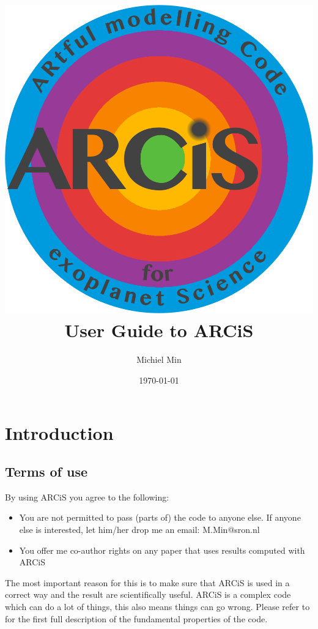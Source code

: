 \documentclass[12pt]{article}
\begin{document}
\title{\includegraphics[width=0.9\hsize]{ARCiS}\\User Guide to ARCiS}
\author{Michiel Min}
\date{\today}
\maketitle

\section{Introduction}


\subsection{Terms of use}

By using ARCiS you agree to the following:
\begin{itemize}
\item You are not permitted to pass (parts of) the code to anyone else. If anyone else is interested, let him/her drop me an email: M.Min@sron.nl
\item You offer me co-author rights on any paper that uses results computed with ARCiS
\end{itemize}
The most important reason for this is to make sure that ARCiS is used in a correct way and the result are scientifically useful. ARCiS is a complex code which can do a lot of things, this also means things can go wrong. Please refer to \cite{2020A&A...642A..28M} for the first full description of the fundamental properties of the code.
\end{document}
